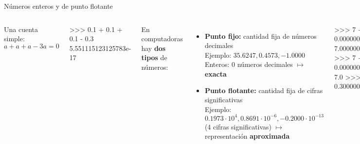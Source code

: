 \documentclass[9pt, aspectratio=169]{beamer}
\begin{document}
\begin{frame}[fragile]{Números enteros y de punto flotante}
  \begin{columns}[t]
    \cx
    Una cuenta simple: $a + a + a - 3a = 0$
    \begin{py}
      >>> 0.1 + 0.1 + 0.1 - 0.3
      5.551115123125783e-17
    \end{py}
    En computadoras hay \textbf{dos tipos} de números:
    \begin{itemize}
      \item \textbf{Punto fijo:} cantidad fija de números decimales\\
            Ejemplo: $35.6247, 0.4573, -1.0000$ \\
            Enteros: 0 números decimales $\mapsto$ \textbf{exacta}
      \item \textbf{Punto flotante:} cantidad fija de cifras significativas\\
            Ejemplo: $0.1973 \cdot 10^4, 0.8691 \cdot 10^{-6}, -0.2000 \cdot 10^{-13}$ (4 cifras significativas) $\mapsto$ representación \textbf{aproximada}
    \end{itemize}
    \begin{py}
      >>> 7 + 0.000000000000001
      7.000000000000001
      >>> 7 + 0.0000000000000001
      7.0
      >>> 0.1 + 0.2
      0.30000000000000004
    \end{py}

    \cx
    \textbf{Estándar IEEE 754}: cuatro \textbf{enteros}

    \[ r = (-1)^s \, m \, b^e \]

    $s$: signo, $m$: mantisa, $b$: base (10, 2, 16), $e$: exponente.

    Ejemplo decimal:
    \begin{align*}
      s & = 0                                         \\
      m & = 31415926                                  \\
      b & = 10                                        \\
      e & = -7                                        \\
      r & = (-1)^0 31415926 \cdot 10^{-7} = 3.1415926
    \end{align*}

    Ejemplo binario:
    \begin{align*}
      r & = \pm m \cdot 2^e, \quad m = 0.d_1d_2\cdots d_n, \quad d_1 > 0 \\
      r & = \pm(d_1 2^{-1} + d_2 2^{-2} + \cdots + d_n 2^{-n}) \cdot 2^e
    \end{align*}
    número de máquina de $k$-dígitos.
  \end{columns}
\end{frame}
\end{document}

